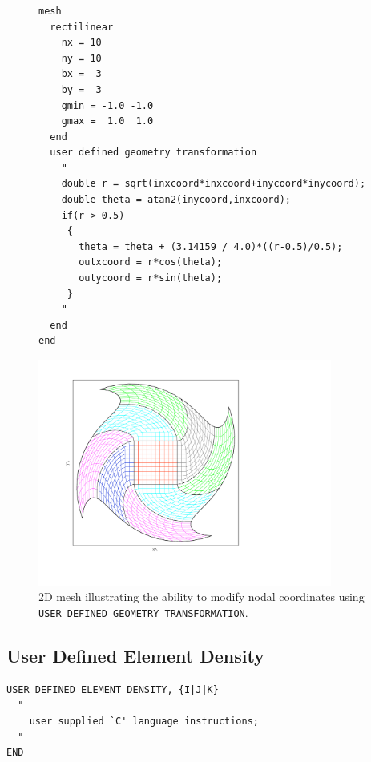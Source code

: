 \begin{figure}[t]
  \centering
    \begin{minipage}{0.3\linewidth}
{\ttfamily \begin{verbatim}










mesh
  rectilinear
    nx = 10
    ny = 10
    bx =  3
    by =  3
    gmin = -1.0 -1.0
    gmax =  1.0  1.0
  end
  user defined geometry transformation
    "
    double r = sqrt(inxcoord*inxcoord+inycoord*inycoord);
    double theta = atan2(inycoord,inxcoord);
    if(r > 0.5)
     {
       theta = theta + (3.14159 / 4.0)*((r-0.5)/0.5);
       outxcoord = r*cos(theta);
       outycoord = r*sin(theta);
     }
    "
  end
end
\end{verbatim}}
    \end{minipage}%
    \hfill
    \begin{minipage}[t]{0.65\linewidth}
        \includegraphics[width=3.8in]{mesh_warp_2d_white_bg}
    \end{minipage}
    \caption [2D Geometry Transformation Example]{2D mesh illustrating the ability to modify nodal coordinates using \texttt{USER
      DEFINED GEOMETRY TRANSFORMATION}.}
    \label{fig:2d_transform_example}
\end{figure}


\clearpage
\subsection{User Defined Element Density}
\label{sec:inline-element-density}


{\ttfamily \small \begin{verbatim}
USER DEFINED ELEMENT DENSITY, {I|J|K} 
  "
    user supplied `C' language instructions;
  "
END
\end{verbatim}
} 

